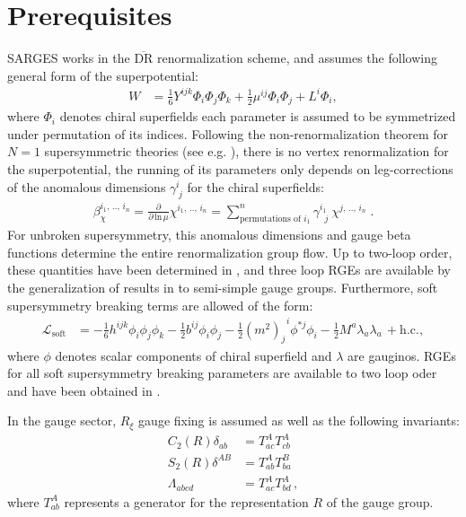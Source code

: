 \documentclass{scrartcl}
\begin{document}
\section{Prerequisites}
SARGES works in the $\overline{\mathrm{DR}}$ renormalization scheme, and assumes the following general form of the superpotential:
\begin{align}
W &= \frac{1}{6} Y^{ijk} \Phi_i \Phi_j \Phi_k + \frac{1}{2} \mu^{ij} \Phi_i \Phi_j + L^i \Phi_i,\label{super_par}
\end{align}
where $\Phi_i$ denotes chiral superfields each parameter is assumed to be symmetrized under permutation of its indices.
Following the non-renormalization theorem for $N=1$ supersymmetric theories (see e.g. \cite{NonRenorm}), there is no vertex renormalization for the superpotential, the running of its parameters only depends on leg-corrections of the anomalous dimensions $\gamma^i_{\;j}$ for the chiral superfields:
\begin{align}
\beta_\chi ^{i_1,\,..,\,i_n} = \frac{\partial}{\partial\,\mathrm{ln}\,\mu} \chi^{i_1,\,..,\,i_n} = \sum_{\textrm{permutations of } i_1}^n \gamma^{i_1\;}_{\;\;j}\, \chi^{j,\,..,\,i_n}\;. \label{anomdim}
\end{align}
For unbroken supersymmetry, this anomalous dimensions and gauge beta functions determine the entire renormalization group flow. Up to two-loop order, these quantities have been determined in \cite{MartinVaughnSUSY,vev1,vev2}, and three loop RGEs are available by the generalization of results in \cite{JackJones1,JackJones2,JackJones3} to semi-simple gauge groups. Furthermore, soft supersymmetry breaking terms are allowed of the form:
\begin{align}
\mathcal{L}_\mathrm{soft} &= -\frac{1}{6} h^{ijk} \phi_i \phi_j \phi_k - \frac{1}{2} b^{ij} \phi_i \phi_j - \frac{1}{2}\left(m^2\right)_{j}	^{\;\;i} \phi^{*j}  \phi_i - \frac{1}{2} M^a\lambda_{a} \lambda_{a}\, + \mathrm{h.c.},\label{soft_par}
\end{align}
where $\phi$ denotes scalar components of chiral superfield and $\lambda$ are gauginos. RGEs for all soft supersymmetry breaking parameters are available to two loop oder and have been obtained in \cite{MartinVaughnSUSY}. 

In the gauge sector, $R_\xi$ gauge fixing is assumed as well as the following invariants:
\begin{align}
C_2(R) \delta_{ab} &= T^A_{ac} T^A_{cb}\\
S_2(R) \delta^{AB} &= T^A_{ab} T^B_{ba} \\
\Lambda_{abcd} &= T^A_{ac} T^A_{bd} \,,
\end{align} 
where $T^A_{ab}$ represents a generator for the representation $R$ of the gauge group.
\end{document}
